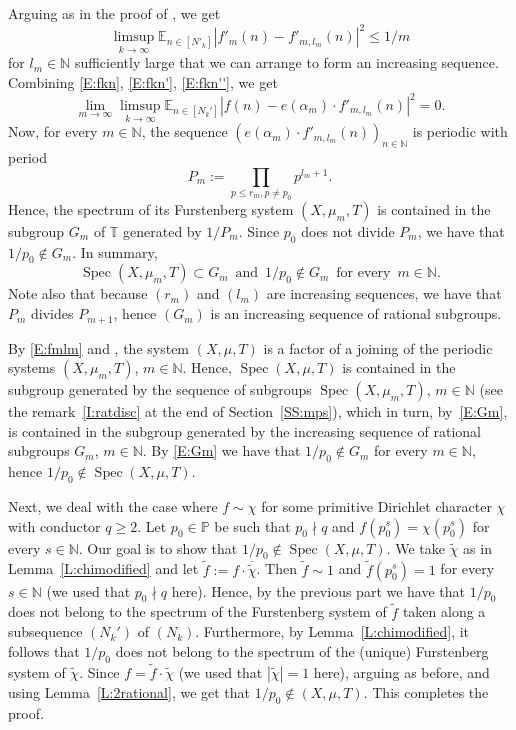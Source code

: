 \documentclass[11pt]{amsart}
\theoremstyle{definition}
\newcommand{\E}{{\mathbb E}}
\newcommand{\N}{{\mathbb N}}
\renewcommand{\P}{{\mathbb P}}
\newcommand{\T}{{\mathbb T}}
\DeclareMathOperator{\spec}{Spec}
\begin{document}
Arguing as in the proof of   \cite[Lemma~4]{DD82}, we get
\begin{equation}\label{E:fkn''}
	\limsup_{k\to\infty}\E_{n\in[N'_k]}|f'_m(n)-f'_{m,l_m}(n)|^2\leq 1/m
\end{equation}
for  $l_m\in \N$ sufficiently large that we can arrange to form an increasing sequence.
Combining \eqref{E:fkn}, \eqref{E:fkn'}, \eqref{E:fkn''},   we get
\begin{equation}\label{E:fmlm}
\lim_{m\to\infty}	\limsup_{k\to\infty}\E_{n\in[N_k']}|f(n)-e(\alpha_m)\cdot f'_{m,l_m}(n)|^2=0.
\end{equation}
 Now, for every $m\in \N$, the sequence $(e(\alpha_m)\cdot f'_{m,l_m}(n))_{n\in\N}$
is periodic with period
$$
P_m:=\prod_{p\leq r_m, p\neq p_0}p^{l_m+1}.
$$
 Hence,    the spectrum of its Furstenberg system $(X,\mu_m,T)$ is contained in the subgroup $G_m$ of $\T$ generated by $1/P_m$. Since $p_0$ does not divide $P_m$, we have that   $1/p_0\not\in G_m$. In summary,
 \begin{equation}\label{E:Gm}
 \spec(X,\mu_m,T)\subset G_m \, \text{ and } \, 1/p_0\not\in  G_m\,  \text{ for every }\,  m\in \N.
 \end{equation}
Note also that because $(r_m)$ and $(l_m)$ are increasing sequences, we have that $P_m$ divides $P_{m+1}$, hence  $(G_m)$ is an increasing sequence of rational subgroups.


By \eqref{E:fmlm} and  \cite[Lemma~3.17]{BPLR19},  the system  $(X,\mu,T)$ is a factor of
a joining of the periodic systems $(X,\mu_m,T)$, $m\in \N$.
Hence,
$\spec(X,\mu,T)$ is contained in the subgroup generated by the  sequence of subgroups $\spec(X,\mu_m,T)$, $m\in \N$ (see  the remark~\eqref{I:ratdisc} at the end of Section~\ref{SS:mps}), which in turn, by~\eqref{E:Gm}, is contained in the subgroup generated by the increasing sequence of rational subgroups $G_m$, $m\in \N$. By \eqref{E:Gm} we have that  $1/p_0\not\in G_m$ for every $m\in\N$, hence $1/p_0\not\in \spec(X,\mu,T)$.


  Next, we deal with the  case where $f\sim \chi$ for some primitive Dirichlet character $\chi$ with conductor $q\geq 2$. 
 Let $p_0\in \P$ be such that  $p_0\nmid q$ and $f(p_0^s)=\chi(p_0^s)$ for every $s\in \N$. Our goal is to show
that  $1/p_0\not\in \spec(X,\mu,T)$. 
We take    $\tilde{\chi}$  as in Lemma~\ref{L:chimodified}  and let  $\tilde{f}:=f\cdot \overline{\tilde{\chi}}$. Then $\tilde{f}\sim 1$ and $\tilde{f}(p_0^s)=1$ for every $s\in \N$ (we used that $p_0\nmid q$ here). 
Hence, by the previous part we have that $1/p_0$ does not belong to the spectrum of the   Furstenberg system of $\tilde{f}$ taken along  a subsequence $(N_k')$ of $(N_k)$.   Furthermore, by  Lemma~\ref{L:chimodified}, it follows  that $1/p_0$ does not belong to the spectrum of the  (unique)  Furstenberg system of $\tilde{\chi}$.
Since $f=\tilde{f}\cdot \tilde{\chi}$ (we used that $|\tilde{\chi}|=1$ here), arguing as before,  and using Lemma~\ref{L:2rational}, we get that $1/p_0\not\in (X,\mu,T)$. This  completes the proof. 
\end{document}
